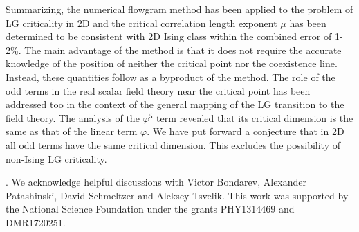 \documentclass[prb,aps,twocolumn,groupedaddress,floats,showpacs,final]{revtex4}
\begin{document}



Summarizing, the numerical flowgram method has been applied to the problem of LG criticality in 2D and the critical correlation length exponent $\mu$ has been determined  to be consistent with 2D Ising class within the combined error of 1-2\%. The main advantage of the method is that it does not require the accurate knowledge of  the position of neither the critical point nor the coexistence line. Instead, these quantities follow as a byproduct of the method. The role of the odd terms in the real scalar field theory near the critical point has been addressed too in the context of the general mapping of the LG transition to the field theory. The analysis of the $\varphi^5$ term revealed that its critical dimension is the same as that of the linear term $\varphi$. We have put forward a  conjecture that in 2D all odd terms have the same critical dimension. This excludes the possibility of non-Ising LG criticality. 




 



.
We acknowledge helpful discussions with Victor Bondarev, Alexander Patashinski, David Schmeltzer and Aleksey Tsvelik.  This work was supported by the National Science Foundation under the grants PHY1314469 and DMR1720251.
\end{document}
